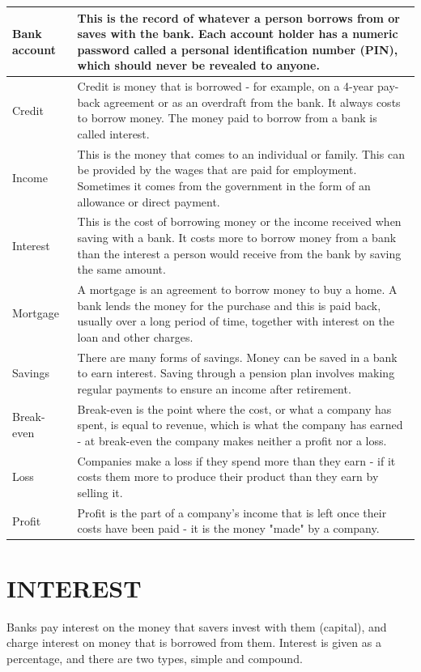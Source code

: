 \documentclass[10pt]{article}
\begin{document}
\begin{center}
\begin{tabular}{|l|l|}
\hline
Bank account & This is the record of whatever a person borrows from or saves with the bank. Each account holder has a numeric password called a personal identification number (PIN), which should never be revealed to anyone. \\
\hline
Credit & Credit is money that is borrowed - for example, on a 4-year pay-back agreement or as an overdraft from the bank. It always costs to borrow money. The money paid to borrow from a bank is called interest. \\
\hline
Income & This is the money that comes to an individual or family. This can be provided by the wages that are paid for employment. Sometimes it comes from the government in the form of an allowance or direct payment. \\
\hline
Interest & This is the cost of borrowing money or the income received when saving with a bank. It costs more to borrow money from a bank than the interest a person would receive from the bank by saving the same amount. \\
\hline
Mortgage & A mortgage is an agreement to borrow money to buy a home. A bank lends the money for the purchase and this is paid back, usually over a long period of time, together with interest on the loan and other charges. \\
\hline
Savings & There are many forms of savings. Money can be saved in a bank to earn interest. Saving through a pension plan involves making regular payments to ensure an income after retirement. \\
\hline
Break-even & Break-even is the point where the cost, or what a company has spent, is equal to revenue, which is what the company has earned - at break-even the company makes neither a profit nor a loss. \\
\hline
Loss & Companies make a loss if they spend more than they earn - if it costs them more to produce their product than they earn by selling it. \\
\hline
Profit & Profit is the part of a company's income that is left once their costs have been paid - it is the money "made" by a company. \\
\hline
\end{tabular}
\end{center}

\section*{INTEREST}
Banks pay interest on the money that savers invest with them (capital), and charge interest on money that is borrowed from them. Interest is given as a percentage, and there are two types, simple and compound.
\end{document}
